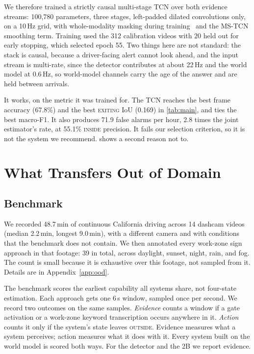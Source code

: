\documentclass[journal]{IEEEtran}
\newcommand{\st}[1]{\textsc{#1}}
\begin{document}
We therefore trained a strictly causal multi-stage TCN over both evidence streams: 100{,}780 parameters, three stages, left-padded dilated convolutions only, on a 10\,Hz grid, with whole-modality masking during training~\cite{neverova2016moddrop} and the MS-TCN smoothing term.  Training used the 312 calibration videos with 20 held out for early stopping, which selected epoch 55.  Two things here are not standard: the stack is causal, because a driver-facing alert cannot look ahead, and the input stream is multi-rate, since the detector contributes at about 22\,Hz and the world model at 0.6\,Hz, so world-model channels carry the age of the answer and are held between arrivals.

It works, on the metric it was trained for.  The TCN reaches the best frame accuracy (67.8\%) and the best \st{exiting} IoU (0.169) in \cref{tab:main}, and ties the best macro-F1.  It also produces 71.9 false alarms per hour, 2.8 times the joint estimator's rate, at 55.1\% \st{inside} precision.  It fails our selection criterion, so it is not the system we recommend.   shows a second reason not to.

\section{What Transfers Out of Domain}
\label{sec:transfer}

\subsection{Benchmark}
We recorded 48.7\,min of continuous California driving across 14 dashcam videos (median 2.2\,min, longest 9.0\,min), with a different camera and with conditions that the benchmark does not contain.  We then annotated every work-zone sign approach in that footage: 39 in total, across daylight, sunset, night, rain, and fog.  The count is small because it is exhaustive over this footage, not sampled from it.  Details are in Appendix~\ref{app:ood}.

The benchmark scores the earliest capability all systems share, not four-state estimation.  Each approach gets one 6\,s window, sampled once per second.  We record two outcomes on the same samples.  \emph{Evidence} counts a window if a gate activation or a work-zone keyword transcription occurs anywhere in it. \emph{Action} counts it only if the system's state leaves \st{outside}. Evidence measures what a system perceives; action measures what it does with it.  Every system built on the world model is scored both ways.  For the detector and the 2B we report evidence.
\end{document}
